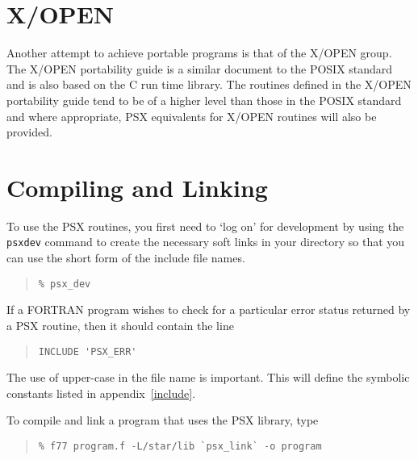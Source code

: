 \documentclass[twoside,11pt]{article}
\newcommand{\xlabel}[1]{}
\renewcommand{\_}{\texttt{\symbol{95}}}
\begin{document}
\section{\xlabel{xopen}X/OPEN}

Another attempt to achieve portable programs is that of the X/OPEN
group. The X/OPEN portability guide is a similar document to the POSIX
standard and is also based on the C run time library. The routines
defined in the X/OPEN portability guide tend to be of a higher level
than those in the POSIX standard and where appropriate, PSX equivalents
for X/OPEN routines will also be provided.

\section{\xlabel{compiling_and_linking}Compiling and Linking}

To use the PSX routines, you first need to `log on' for development by using
the \texttt{psx\_dev} command to create the necessary soft links in your 
directory so that you can use the short form of the include file names.

\begin{quote}\begin{verbatim}
% psx_dev
\end{verbatim}\end{quote}

If a FORTRAN program wishes to check for a particular error status returned by
a PSX routine, then it should contain the line

\begin{quote}\begin{verbatim}
INCLUDE 'PSX_ERR'
\end{verbatim}\end{quote}

The use of upper-case in the file name is important. This will define the
symbolic constants listed in appendix~\ref{include}.

To compile and link a program that uses the PSX library, type

\begin{quote}\begin{verbatim}
% f77 program.f -L/star/lib `psx_link` -o program
\end{verbatim}\end{quote}
\end{document}
